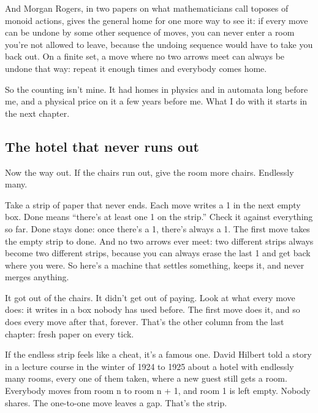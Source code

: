 \documentclass[11pt,twoside]{article}
\theoremstyle{thielethm}
\theoremstyle{thieledef}
\theoremstyle{thieledef}
\theoremstyle{thieledef}
\theoremstyle{thielethm}
\theoremstyle{thieleobs}
\theoremstyle{thielethm}
\begin{document}
And Morgan Rogers, in two papers on what mathematicians call toposes of monoid actions, gives the general home for one more way to see it: if every move can be undone by some other sequence of moves, you can never enter a room you're not allowed to leave, because the undoing sequence would have to take you back out. On a finite set, a move where no two arrows meet can always be undone that way: repeat it enough times and everybody comes home.

So the counting isn't mine. It had homes in physics and in automata long before me, and a physical price on it a few years before me. What I do with it starts in the next chapter.

\subsection{The hotel that never runs out}

Now the way out. If the chairs run out, give the room more chairs. Endlessly many.

Take a strip of paper that never ends. Each move writes a 1 in the next empty box. Done means ``there's at least one 1 on the strip.'' Check it against everything so far. Done stays done: once there's a 1, there's always a 1. The first move takes the empty strip to done. And no two arrows ever meet: two different strips always become two different strips, because you can always erase the last 1 and get back where you were. So here's a machine that settles something, keeps it, and never merges anything.

It got out of the chairs. It didn't get out of paying. Look at what every move does: it writes in a box nobody has used before. The first move does it, and so does every move after that, forever. That's the other column from the last chapter: fresh paper on every tick.

If the endless strip feels like a cheat, it's a famous one. David Hilbert told a story in a lecture course in the winter of 1924 to 1925 about a hotel with endlessly many rooms, every one of them taken, where a new guest still gets a room. Everybody moves from room n to room n + 1, and room 1 is left empty. Nobody shares. The one-to-one move leaves a gap. That's the strip.
\end{document}
